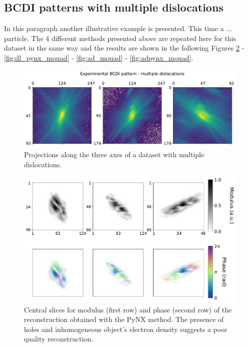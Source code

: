 \subsection{BCDI patterns with multiple dislocations}

In this paragraph another illustrative example is presented. This time a ... particle. 
The 4 different methods presented above are repeated here for this dataset in the same way and the results are shown in  
the following Figures \ref{fig:pynx_mouad} - \ref{fig:dl_pynx_mouad} - \ref{fig:ad_mouad} - \ref{fig:adpynx_mouad}. 

\begin{figure}[H]
  \centering
  \includegraphics[width=\textwidth]{figures/AD/projections_mouad.pdf}
  \caption{Projections along the three axes of a dataset with multiple dislocations. }
  \label{fig:projectsions_mouad}
\end{figure}

\begin{figure}[H]
  \centering
  \includegraphics[width=\textwidth]{figures/AD/pynx_mouad.pdf}
  \caption{Central slices for modulus (first row) and phase (second row) of the reconstruction obtained with the PyNX method.
  The presence of holes and inhomogeneous object's electron density suggests a poor quality reconstruction. }
  \label{fig:pynx_mouad}
\end{figure}

